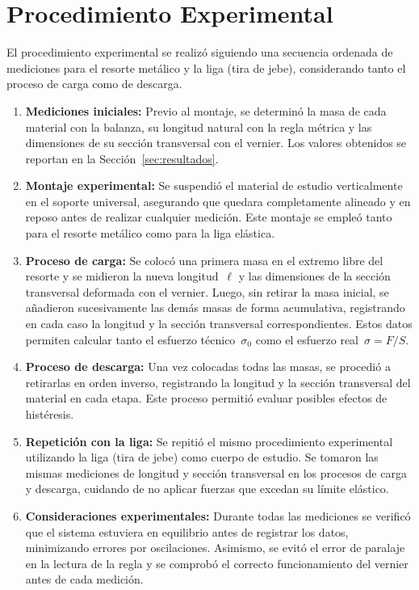 \section{Procedimiento Experimental}

El procedimiento experimental se realizó siguiendo una secuencia ordenada de
mediciones para el resorte metálico y la liga (tira de jebe), considerando
tanto el proceso de carga como de descarga.

\begin{enumerate}

\item \textbf{Mediciones iniciales:}
    Previo al montaje, se determinó la masa de cada material con la balanza,
    su longitud natural con la regla métrica y las dimensiones de su sección
    transversal con el vernier. Los valores obtenidos se reportan en la
    Sección~\ref{sec:resultados}.

\item \textbf{Montaje experimental:}
    Se suspendió el material de estudio verticalmente en el soporte
    universal, asegurando que quedara completamente alineado y en reposo
    antes de realizar cualquier medición. Este montaje se empleó tanto
    para el resorte metálico como para la liga elástica.

\item \textbf{Proceso de carga:}
    Se colocó una primera masa en el extremo libre del resorte y se midieron
    la nueva longitud~$\ell$ y las dimensiones de la sección transversal
    deformada con el vernier. Luego, sin retirar la masa inicial, se
    añadieron sucesivamente las demás masas de forma acumulativa, registrando
    en cada caso la longitud y la sección transversal correspondientes.
    Estos datos permiten calcular tanto el esfuerzo técnico~$\sigma_0$
    como el esfuerzo real~$\sigma = F/S$.

\item \textbf{Proceso de descarga:}
    Una vez colocadas todas las masas, se procedió a retirarlas en orden
    inverso, registrando la longitud y la sección transversal del material
    en cada etapa. Este proceso permitió evaluar posibles efectos de
    histéresis.

\item \textbf{Repetición con la liga:}
    Se repitió el mismo procedimiento experimental utilizando la liga (tira
    de jebe) como cuerpo de estudio. Se tomaron las mismas mediciones de
    longitud y sección transversal en los procesos de carga y descarga,
    cuidando de no aplicar fuerzas que excedan su límite elástico.

\item \textbf{Consideraciones experimentales:}
    Durante todas las mediciones se verificó que el sistema estuviera en
    equilibrio antes de registrar los datos, minimizando errores por
    oscilaciones. Asimismo, se evitó el error de paralaje en la lectura de
    la regla y se comprobó el correcto funcionamiento del vernier antes de
    cada medición.

\end{enumerate}